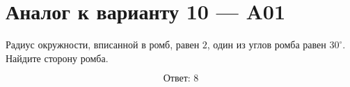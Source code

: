 


\section*{Аналог к варианту 10 — A01}
Радиус окружности, вписанной в ромб, равен \(2\), один из углов ромба равен \(30^\circ\). Найдите сторону ромба.
\begin{center}\figRhombusInradius\end{center}
\[\boxed{\text{Ответ: }8}\]

